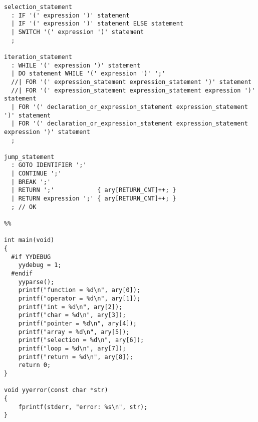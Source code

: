 \documentclass{article}
\begin{document}
\begin{verbatim}
selection_statement
  : IF '(' expression ')' statement
  | IF '(' expression ')' statement ELSE statement
  | SWITCH '(' expression ')' statement
  ;

iteration_statement
  : WHILE '(' expression ')' statement
  | DO statement WHILE '(' expression ')' ';'
  //| FOR '(' expression_statement expression_statement ')' statement
  //| FOR '(' expression_statement expression_statement expression ')' statement
  | FOR '(' declaration_or_expression_statement expression_statement ')' statement
  | FOR '(' declaration_or_expression_statement expression_statement expression ')' statement
  ;

jump_statement
  : GOTO IDENTIFIER ';'
  | CONTINUE ';'
  | BREAK ';'
  | RETURN ';'            { ary[RETURN_CNT]++; }
  | RETURN expression ';' { ary[RETURN_CNT]++; }
  ; // OK

%%

int main(void)
{
  #if YYDEBUG
    yydebug = 1;
  #endif
	yyparse();
	printf("function = %d\n", ary[0]);
	printf("operator = %d\n", ary[1]);
	printf("int = %d\n", ary[2]);
	printf("char = %d\n", ary[3]);
	printf("pointer = %d\n", ary[4]);
	printf("array = %d\n", ary[5]);
	printf("selection = %d\n", ary[6]);
	printf("loop = %d\n", ary[7]);
	printf("return = %d\n", ary[8]);
	return 0;
}

void yyerror(const char *str)
{
	fprintf(stderr, "error: %s\n", str);
}

\end{verbatim}
\end{document}
